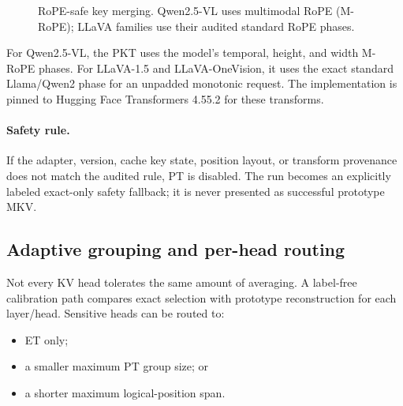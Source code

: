 \documentclass[11pt]{article}
\newcommand{\safety}{\paragraph{Safety rule.}}
\begin{document}
\begin{figure}[htbp]
\centering
{}
\caption{RoPE-safe key merging. Qwen2.5-VL uses multimodal RoPE (M-RoPE); LLaVA families use
their audited standard RoPE phases.}
\label{fig:rope}
\end{figure}

For Qwen2.5-VL, the PKT uses the model's temporal, height, and width M-RoPE phases. For LLaVA-1.5
and LLaVA-OneVision, it uses the exact standard Llama/Qwen2 phase for an unpadded monotonic request.
The implementation is pinned to Hugging Face Transformers 4.55.2 for these transforms.

\safety If the adapter, version, cache key state, position layout, or transform provenance does
not match the audited rule, PT is disabled. The run becomes an explicitly labeled exact-only
safety fallback; it is never presented as successful prototype MKV.

\subsection{Adaptive grouping and per-head routing}

Not every KV head tolerates the same amount of averaging. A label-free calibration path compares
exact selection with prototype reconstruction for each layer/head. Sensitive heads can be routed
to:

\begin{itemize}
  \item ET only;
  \item a smaller maximum PT group size; or
  \item a shorter maximum logical-position span.
\end{itemize}
\end{document}
